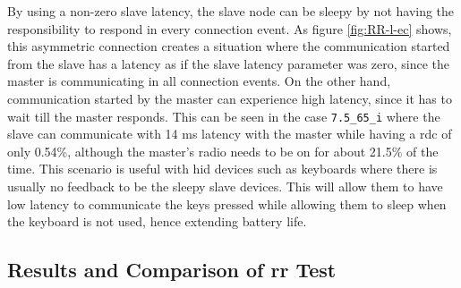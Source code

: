 By using a non-zero slave latency, the slave node can be sleepy by not having the responsibility to respond in every connection event. As figure \ref{fig:RR-l-ec} shows, this asymmetric connection creates a situation where the communication started from the slave has a latency as if the slave latency parameter was zero, since the master is communicating in all connection events. On the other hand, communication started by the master can experience high latency, since it has to wait till the master responds. This can be seen in the case \texttt{7.5\_65\_i} where the slave can communicate with 14 ms latency with the master while having a \gls{rdc} of only 0.54\%, although the master's radio needs to be on for about 21.5\% of the time. This scenario is useful with \gls{hid} devices such as keyboards where there is usually no feedback to be the sleepy slave devices. This will allow them to have low latency to communicate the keys pressed while allowing them to sleep when the keyboard is not used, hence extending battery life.
%
%

\subsection{Results and Comparison of \texorpdfstring{\acrlong{rr}}{Request-Response} Test}


